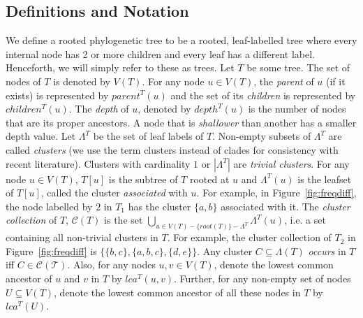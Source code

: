 \documentclass{article}
\newcommand{\leafset}{\Lambda}
\begin{document}
    \subsection{Definitions and Notation}
    \label{subsec:def}

    We define a rooted phylogenetic tree to be a rooted, leaf-labelled tree where every internal node has 2 or more children and every leaf has a different label. Henceforth, we will simply refer to these as trees. Let $T$ be some tree. The set of nodes of $T$ is denoted by $V(T)$. For any node $u \in V(T)$, the \textit{parent} of $u$ (if it exists) is represented by $parent^T(u)$ and the set of its \textit{children} is represented by $children^T(u)$. The \textit{depth} of $u$, denoted by $depth^T(u)$ is the number of nodes that are its proper ancestors. A node that is \textit{shallower} than another has a smaller depth value. Let $\leafset^T$ be the set of leaf labels of $T$. Non-empty subsets of $\leafset^T$ are called \textit{clusters} (we use the term clusters instead of clades for consistency with recent literature). Clusters with cardinality $1$ or $|\leafset^T|$ are \textit{trivial clusters}. For any node $u \in V(T)$, $T[u]$ is the subtree of $T$ rooted at $u$ and $\leafset^T(u)$ is the leafset of $T[u]$, called the cluster \textit{associated} with $u$. For example, in Figure~\ref{fig:freqdiff}, the node labelled by $2$ in $T_1$ has the cluster $\{a, b\}$ associated with it. The \textit{cluster collection} of $T$, $\mathcal{C}(T)$ is the set $\bigcup_{u \in V(T) - \{root(T)\} - \leafset^T} {\leafset^T(u)}$, i.e. a set containing all non-trivial clusters in $T$. For example, the cluster collection of $T_2$ in Figure~\ref{fig:freqdiff} is $\{\{b, c\}, \{a, b, c\}, \{d, e\}\}$. Any cluster $C \subseteq \leafset(T)$ \textit{occurs} in $T$ iff $C \in \mathcal{C(T)}$. Also, for any nodes $u, v \in V(T)$, denote the lowest common ancestor of $u$ and $v$ in $T$ by $lca^T(u, v)$. Further, for any non-empty set of nodes $U \subseteq V(T)$, denote the lowest common ancestor of all these nodes in $T$ by $lca^T(U)$.
\end{document}
